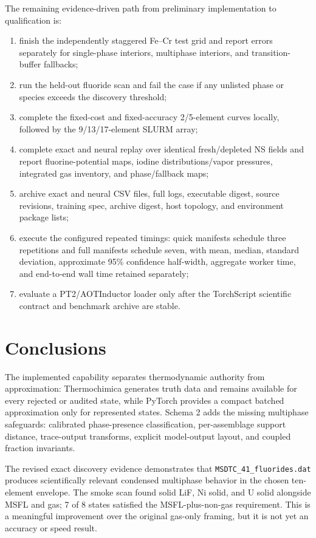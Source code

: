 \documentclass[11pt]{article}
\newcommand{\code}[1]{\texttt{#1}}
\begin{document}
The remaining evidence-driven path from preliminary implementation to qualification is:
\begin{enumerate}[leftmargin=*]
  \item finish the independently staggered Fe--Cr test grid and report errors separately for
  single-phase interiors, multiphase interiors, and transition-buffer fallbacks;
  \item run the held-out fluoride scan and fail the case if any unlisted phase or species exceeds
  the discovery threshold;
  \item complete the fixed-cost and fixed-accuracy 2/5-element curves locally, followed by the
  9/13/17-element SLURM array;
  \item complete exact and neural replay over identical fresh/depleted NS fields and report
  fluorine-potential maps, iodine distributions/vapor pressures, integrated gas inventory, and
  phase/fallback maps;
  \item archive exact and neural CSV files, full logs, executable digest, source revisions,
  training spec, archive digest, host topology, and environment package lists;
  \item execute the configured repeated timings: quick manifests schedule three repetitions and
  full manifests schedule seven, with mean, median, standard deviation, approximate 95\%
  confidence half-width, aggregate worker time, and end-to-end wall time retained separately;
  \item evaluate a PT2/AOTInductor loader only after the TorchScript scientific contract and
  benchmark archive are stable.
\end{enumerate}

\section{Conclusions}

The implemented capability separates thermodynamic authority from approximation: Thermochimica
generates truth data and remains available for every rejected or audited state, while PyTorch
provides a compact batched approximation only for represented states.  Schema 2 adds the missing
multiphase safeguards: calibrated phase-presence classification, per-assemblage support distance,
trace-output transforms, explicit model-output layout, and coupled fraction invariants.

The revised exact discovery evidence demonstrates that
\code{MSDTC\_41\_fluorides.dat} produces scientifically relevant condensed multiphase behavior in
the chosen ten-element envelope.  The smoke scan found solid LiF, Ni solid, and U solid alongside
MSFL and gas; 7 of 8 states satisfied the MSFL-plus-non-gas requirement.  This is a meaningful
improvement over the original gas-only framing, but it is not yet an accuracy or speed result.
\end{document}
